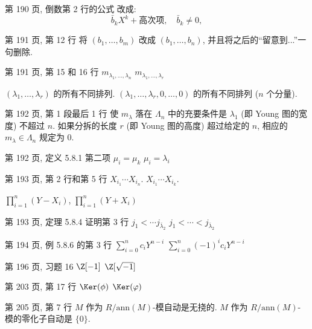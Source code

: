 \documentclass{AJerrata}
\begin{document}
\begin{Errata}
		\item[第 190 页, 倒数第 2 行的公式]
		改成:
		\[ \bar{b}_k X^k + \text{高次项}, \quad \bar{b}_k \neq 0, \]

		\item[第 191 页, 第 12 行]
		将 $(b_1, \ldots, b_m)$ 改成 $(b_1, \ldots, b_n)$, 并且将之后的``留意到...''一句删除.
		
		\item[第 191 页, 第 15 和 16 行]
		\Orig $m_{\lambda_1, \ldots, \lambda_n}$
		\Corr $m_{\lambda_1, \ldots, \lambda_r}$
		
		\Orig $(\lambda_1, \ldots, \lambda_r)$ 的所有不同排列.
		\Corr $(\lambda_1, \ldots, \lambda_r, 0, \ldots, 0)$ 的所有不同排列 ($n$ 个分量).
		
		\item[第 192 页, 第 1 段最后 1 行]
		\Orig 使 $m_\lambda$ 落在 $\Lambda_n$ 中的充要条件是 $\lambda_1$ (即 Young 图的宽度) 不超过 $n$.
		\Corr 如果分拆的长度 $r$ (即 Young 图的高度) 超过给定的 $n$, 相应的 $m_\lambda \in \Lambda_n$ 规定为 $0$.
		
		\item[第 192 页, 定义 5.8.1 第二项]
		\Orig $\mu_i = \mu_k$
		\Corr $\mu_i = \lambda_i$
		
		\item[第 193 页, 第 2 行和第 5 行]
		\Orig $X_{i_1} \cdots X_{i_n}$.
		\Corr $X_{i_1} \cdots X_{i_k}$.
		
		\Orig $\prod_{i=1}^n (Y - X_i)$,
		\Corr $\prod_{i=1}^n (Y + X_i)$
		
		\item[第 193 页, 定理 5.8.4 证明第 3 行]
		\Orig $j_1 < \cdots j_{\bar{\lambda}_2}$
		\Corr $j_1 < \cdots < j_{\bar{\lambda}_2}$
				
		\item[第 194 页, 例 5.8.6 的第 3 行]
		\Orig $\sum_{i=0}^n c_i Y^{n-i}$
		\Corr $\sum_{i=0}^n (-1)^i c_i Y^{n-i}$
		
		\item[第 196 页, 习题 16]
		\Orig $\Z[-1]$
		\Corr $\Z[\sqrt{-1}]$
		
		\item[第 203 页, 第 17 行]
		\Orig $\Ker(\phi)$
		\Corr $\Ker(\varphi)$

   		\item[第 205 页, 第 7 行]
		\Orig $M$ 作为 $R/\mathrm{ann}(M)$-模自动是无挠的.
		\Corr $M$ 作为 $R/\mathrm{ann}(M)$-模的零化子自动是 $\{0\}$.


\end{Errata}
\end{document}
